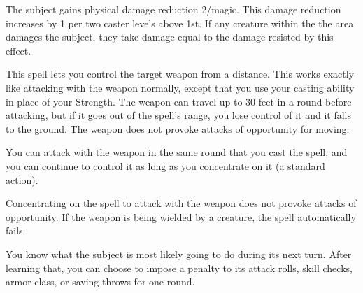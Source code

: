 \spellrng{\rngclose}
\begin{spelleffect}
The subject gains physical damage reduction 2/magic. This damage reduction increases by 1 per two caster levels above 1st. If any creature within the the area damages the subject, they take damage equal to the damage resisted by this effect.
\end{spelleffect}

\spellrng{\rngclose}
\begin{spelleffect}
This spell lets you control the target weapon from a distance. This works exactly like attacking with the weapon normally, except that you use your casting ability in place of your Strength.
The weapon can travel up to 30 feet in a round before attacking, but if it goes out of the spell's range, you lose control of it and it falls to the ground. The weapon does not provoke attacks of opportunity for moving.
\par You can attack with the weapon in the same round that you cast the spell, and you can continue to control it as long as you concentrate on it (a standard action).
\end{spelleffect}
\begin{spellnotes}
Concentrating on the spell to attack with the weapon does not provoke attacks of opportunity. If the weapon is being wielded by a creature, the spell automatically fails.
\end{spellnotes}

\spellrng{\rngclose}
\begin{spelleffect}
You know what the subject is most likely going to do during its next turn. After learning that, you can choose to impose a  penalty to its attack rolls, skill checks, armor class, or saving throws for one round.
\end{spelleffect}